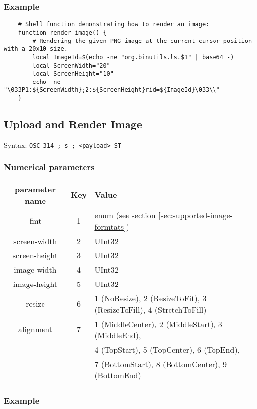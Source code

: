 \documentclass[a4paper]{article}
\newcommand{\code}[1]{\colorbox{light-gray}{\texttt{#1}}}
\begin{document}
\subsubsection*{Example}

\begin{verbatim}
    # Shell function demonstrating how to render an image:
    function render_image() {
        # Rendering the given PNG image at the current cursor position with a 20x10 size.
        local ImageId=$(echo -ne "org.binutils.ls.$1" | base64 -)
        local ScreenWidth="20"
        local ScreenHeight="10"
        echo -ne "\033P1:${ScreenWidth};2:${ScreenHeight}rid=${ImageId}\033\\"
    }
\end{verbatim}

\subsection{Upload and Render Image} %

Syntax: \code{OSC 314 ; s ; <payload> ST}

\subsubsection*{Numerical parameters}

\begin{tabular}{ |c|c|l| }
    \hline
    \textbf{parameter name}   & \textbf{Key} & \textbf{Value} \\
    \hline
    fmt         & 1   & enum (see section \ref{sec:supported-image-formtats}) \\
    screen-width  & 2   & UInt32 \\
    screen-height & 3   & UInt32 \\
    image-width & 4   & UInt32 \\
    image-height& 5   & UInt32 \\
    resize      & 6   & 1 (NoResize), 2 (ResizeToFit), 3 (ResizeToFill), 4 (StretchToFill) \\
    alignment   & 7   & 1 (MiddleCenter), 2 (MiddleStart), 3 (MiddleEnd), \\
                &     & 4 (TopStart), 5 (TopCenter), 6 (TopEnd), \\
                &     & 7 (BottomStart), 8 (BottomCenter), 9 (BottomEnd) \\
    \hline
\end{tabular}

\subsubsection*{Example}
\end{document}
